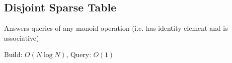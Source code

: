 \subsection{Disjoint Sparse Table}
Answers queries of any monoid operation (i.e. has identity element and is associative)

Build: $O(N \log N)$, Query: $O(1)$
